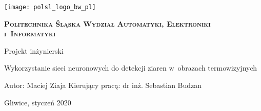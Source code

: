 \newpage
\thispagestyle{empty}
\begin{onehalfspacing}
\begin{center}
	\texttt{[image: polsl\_logo\_bw\_pl]}
	\vspace{0.8cm}
	
	\fontsize{18}{18} \selectfont
	\textbf{\textsc{Politechnika Śląska \linebreak
	Wydział Automatyki, Elektroniki i~Informatyki}}
	\vspace{1.3cm}
	
	\fontsize{16}{16} \selectfont
	Projekt inżynierski
	\vspace{1.7cm}
	
	\fontsize{14}{14} \selectfont
	Wykorzystanie sieci neuronowych do detekcji ziaren
	w~obrazach termowizyjnych
	\vspace{5cm}
	
	\begin{flushleft}
	Autor: Maciej Ziaja \linebreak
	Kierujący pracą: dr inż. Sebastian Budzan \linebreak
	\end{flushleft}
	
	\vfill
	\fontsize{12}{12} \selectfont
	Gliwice, styczeń 2020
\end{center}
\end{onehalfspacing}
\restoregeometry
